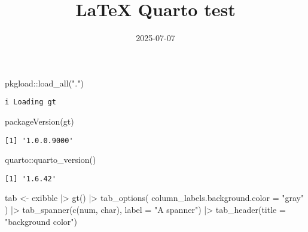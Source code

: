 \documentclass[
  letterpaper,
  DIV=11,
  numbers=noendperiod]{scrartcl}
\title{LaTeX Quarto test}
\author{}
\date{2025-07-07}
\newenvironment{Shaded}{\begin{snugshade}}{\end{snugshade}}
\newcommand{\AttributeTok}[1]{\textcolor[rgb]{0.40,0.45,0.13}{#1}}
\newcommand{\FunctionTok}[1]{\textcolor[rgb]{0.28,0.35,0.67}{#1}}
\newcommand{\NormalTok}[1]{\textcolor[rgb]{0.00,0.23,0.31}{#1}}
\newcommand{\OtherTok}[1]{\textcolor[rgb]{0.00,0.23,0.31}{#1}}
\newcommand{\SpecialCharTok}[1]{\textcolor[rgb]{0.37,0.37,0.37}{#1}}
\newcommand{\StringTok}[1]{\textcolor[rgb]{0.13,0.47,0.30}{#1}}
\begin{document}
\maketitle

\listoftables

\begin{Shaded}
\begin{Highlighting}[]
\NormalTok{pkgload}\SpecialCharTok{::}\FunctionTok{load\_all}\NormalTok{(}\StringTok{"."}\NormalTok{)}
\end{Highlighting}
\end{Shaded}

\begin{verbatim}
i Loading gt
\end{verbatim}

\begin{Shaded}
\begin{Highlighting}[]
\FunctionTok{packageVersion}\NormalTok{(}\StringTok{\textquotesingle{}gt\textquotesingle{}}\NormalTok{)}
\end{Highlighting}
\end{Shaded}

\begin{verbatim}
[1] '1.0.0.9000'
\end{verbatim}

\begin{Shaded}
\begin{Highlighting}[]
\NormalTok{quarto}\SpecialCharTok{::}\FunctionTok{quarto\_version}\NormalTok{()}
\end{Highlighting}
\end{Shaded}

\begin{verbatim}
[1] '1.6.42'
\end{verbatim}

\newpage{}

\begin{Shaded}
\begin{Highlighting}[]
\NormalTok{tab }\OtherTok{\textless{}{-}}\NormalTok{ exibble }\SpecialCharTok{|\textgreater{}}
  \FunctionTok{gt}\NormalTok{() }\SpecialCharTok{|\textgreater{}}
  \FunctionTok{tab\_options}\NormalTok{(}
    \AttributeTok{column\_labels.background.color =} \StringTok{"gray"}
\NormalTok{  ) }\SpecialCharTok{|\textgreater{}}
  \FunctionTok{tab\_spanner}\NormalTok{(}\FunctionTok{c}\NormalTok{(num, char), }\AttributeTok{label =} \StringTok{"A spanner"}\NormalTok{) }\SpecialCharTok{|\textgreater{}}
  \FunctionTok{tab\_header}\NormalTok{(}\AttributeTok{title =} \StringTok{"background color"}\NormalTok{)}
\end{Highlighting}
\end{Shaded}
\end{document}
